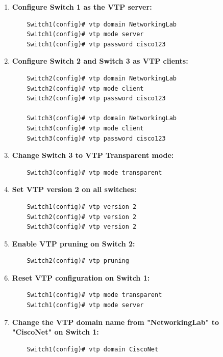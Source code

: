 \documentclass[a4paper]{book}
\begin{document}
\begin{enumerate}
    \item \textbf{Configure Switch 1 as the VTP server:}
    \begin{lstlisting}
    Switch1(config)# vtp domain NetworkingLab
    Switch1(config)# vtp mode server
    Switch1(config)# vtp password cisco123
    \end{lstlisting}

    \item \textbf{Configure Switch 2 and Switch 3 as VTP clients:}
    \begin{lstlisting}
    Switch2(config)# vtp domain NetworkingLab
    Switch2(config)# vtp mode client
    Switch2(config)# vtp password cisco123

    Switch3(config)# vtp domain NetworkingLab
    Switch3(config)# vtp mode client
    Switch3(config)# vtp password cisco123
    \end{lstlisting}

    \item \textbf{Change Switch 3 to VTP Transparent mode:}
    \begin{lstlisting}
    Switch3(config)# vtp mode transparent
    \end{lstlisting}

    \item \textbf{Set VTP version 2 on all switches:}
    \begin{lstlisting}
    Switch1(config)# vtp version 2
    Switch2(config)# vtp version 2
    Switch3(config)# vtp version 2
    \end{lstlisting}

    \item \textbf{Enable VTP pruning on Switch 2:}
    \begin{lstlisting}
    Switch2(config)# vtp pruning
    \end{lstlisting}

    \item \textbf{Reset VTP configuration on Switch 1:}
    \begin{lstlisting}
    Switch1(config)# vtp mode transparent
    Switch1(config)# vtp mode server
    \end{lstlisting}

    \item \textbf{Change the VTP domain name from "NetworkingLab" to "CiscoNet" on Switch 1:}
    \begin{lstlisting}
    Switch1(config)# vtp domain CiscoNet
    \end{lstlisting}


\end{enumerate}
\end{document}
